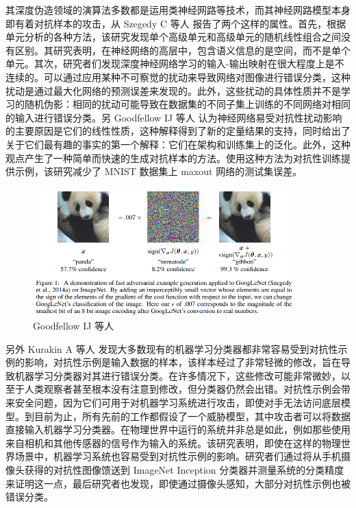 其深度伪造领域的演算法多数都是运用类神经网路等技术，而其神经网路模型本身即有着对抗样本的攻击，从 Szegedy C 等人 \cite{szegedy2013intriguing} 报告了两个这样的属性。首先，根据单元分析的各种方法，该研究发现单个高级单元和高级单元的随机线性组合之间没有区别。其研究表明，在神经网络的高层中，包含语义信息的是空间，而不是单个单元。其次，研究者们发现深度神经网络学习的输入-输出映射在很大程度上是不连续的。可以通过应用某种不可察觉的扰动来导致网络对图像进行错误分类，这种扰动是通过最大化网络的预测误差来发现的。此外，这些扰动的具体性质并不是学习的随机伪影：相同的扰动可能导致在数据集的不同子集上训练的不同网络对相同的输入进行错误分类。另 Goodfellow IJ 等人 \cite{goodfellow2014explaining} 认为神经网络易受对抗性扰动影响的主要原因是它们的线性性质，这种解释得到了新的定量结果的支持，同时给出了关于它们最有趣的事实的第一个解释：它们在架构和训练集上的泛化。此外，这种观点产生了一种简单而快速的生成对抗样本的方法。使用这种方法为对抗性训练提供示例，该研究减少了 MNIST 数据集上 maxout 网络的测试集误差。

\begin{figure}[htb]
\centering 
\includegraphics[width=0.90\textwidth]{img/ch4m2.png} 
\caption{ Goodfellow IJ 等人 \cite{goodfellow2014explaining} }
\label{Test}
\end{figure}

另外 Kurakin A 等人 \cite{kurakin2018adversarial} 发现大多数现有的机器学习分类器都非常容易受到对抗性示例的影响，对抗性示例是输入数据的样本，该样本经过了非常轻微的修改，旨在导致机器学习分类器对其进行错误分类。在许多情况下，这些修改可能非常微妙，以至于人类观察者甚至根本没有注意到修改，但分类器仍然会出错。对抗性示例会带来安全问题，因为它们可用于对机器学习系统进行攻击，即使对手无法访问底层模型。到目前为止，所有先前的工作都假设了一个威胁模型，其中攻击者可以将数据直接输入机器学习分类器。在物理世界中运行的系统并非总是如此，例如那些使用来自相机和其他传感器的信号作为输入的系统。该研究表明，即使在这样的物理世界场景中，机器学习系统也容易受到对抗性示例的影响。研究者们通过将从手机摄像头获得的对抗性图像馈送到 ImageNet Inception 分类器并测量系统的分类精度来证明这一点，最后研究者也发现，即使通过摄像头感知，大部分对抗性示例也被错误分类。

